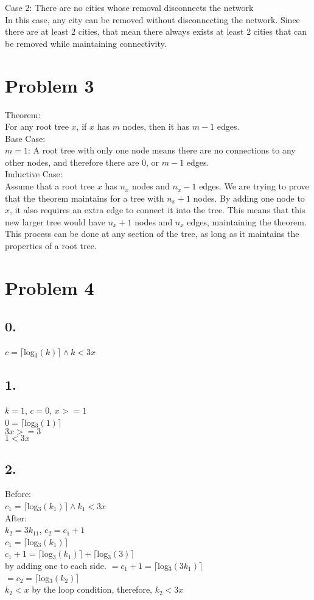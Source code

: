 \documentclass{article}
\begin{document}
\newline
Case 2: There are no cities whose removal disconnects the network\\
In this case, any city can be removed without disconnecting the network. Since there are at least 2 cities, that mean there always exists at least 2 cities that can be removed while maintaining connectivity.
\section*{Problem 3}
Theorem:\\
For any root tree $x$, if $x$ has $m$ nodes, then it has $m-1$ edges.\\
\newline
Base Case:\\
$m=1$: A root tree with only one node means there are no connections to any other nodes, and therefore there are 0, or $m-1$ edges.\\
\newline
Inductive Case:\\
Assume that a root tree $x$ has $n_x$ nodes and $n_x-1$ edges. We are trying to prove that the theorem maintains for a tree with $n_x+1$ nodes. By adding one node to $x$, it also requires an extra edge to connect it into the tree. This means that this new larger tree would have $n_x+1$ nodes and $n_x$ edges, maintaining the theorem. This process can be done at any section of the tree, as long as it maintains the properties of a root tree.
\section*{Problem 4}
\subsection*{0.}
$c= \lceil$log$_3(k)\rceil\land k<3x$
\subsection*{1.}
$k=1$, $c=0$, $x>=1$\\
$0= \lceil$log$_3(1)\rceil$\\
$3x>=3$\\
$1<3x$
\subsection*{2.}
Before:\\
$c_1= \lceil$log$_3(k_1)\rceil\land k_1<3x$\\
After:\\
$k_2=3k_11$, $c_2=c_1+1$\\
$c_1= \lceil$log$_3(k_1)\rceil$\\
$c_1+1= \lceil$log$_3(k_1)\rceil+\lceil$log$_3(3)\rceil$\\ by adding one to each side.
$=c_1+1= \lceil$log$_3(3k_1)\rceil$\\
$=c_2= \lceil$log$_3(k_2)\rceil$\\
$k_2<x$ by the loop condition, therefore, $k_2<3x$
\end{document}
